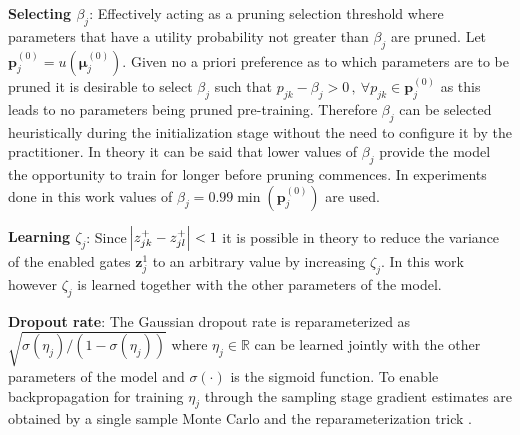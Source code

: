 \documentclass[final,1p,times]{elsarticle}
\begin{document}
\textbf{Selecting $\beta_j$}: Effectively acting as a pruning selection threshold where parameters that have a utility probability not greater than $\beta_j$ are pruned. Let $\mathbf{p}_j^{(0)} = u(\boldsymbol{\mu}_j^{(0)})$. Given no a priori preference as to which parameters are to be pruned it is desirable to select $\beta_j$ such that $p_{jk} - \beta_j > 0 \, , \: \forall p_{jk} \in \mathbf{p}_j^{(0)}$ as this leads to no parameters being pruned pre-training. Therefore $\beta_j$ can be selected heuristically during the initialization stage without the need to configure it by the practitioner. In theory it can be said that lower values of $\beta_j$ provide the model the opportunity to train for longer before pruning commences. In experiments done in this work values of $\beta_j = 0.99 \min ( \mathbf{p}_j^{(0)} ) $ are used. \newline

\textbf{Learning $\zeta_j$}: Since $ \abs{z_{jk}^+ - z_{jl}^+} < 1 $ it is possible in theory to reduce the variance of the enabled gates $\mathbf{z}_j^1$ to an arbitrary value by increasing $\zeta_j$. In this work however $\zeta_j$ is learned together with the other parameters of the model. \newline

\textbf{Dropout rate}: The Gaussian dropout rate is reparameterized as $\sqrt{\sigma(\eta_j)/(1-\sigma(\eta_j))}$ where $\eta_j \in \mathbb{R}$ can be learned jointly with the other parameters of the model and $\sigma(\cdot)$ is the sigmoid function. To enable backpropagation for training $\eta_j$ through the sampling stage gradient estimates are obtained by a single sample Monte Carlo and the reparameterization trick \cite{Kingma2014, pmlr-v32-rezende14}.
\end{document}
